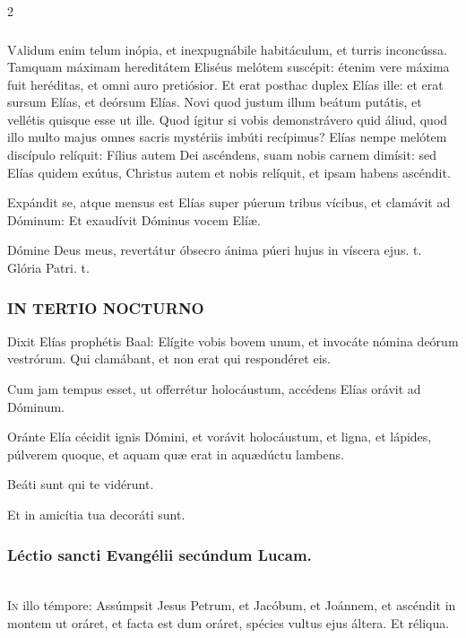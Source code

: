 \documentclass[9pt,twoside]{extarticle}
\begin{document}
\begin{multicols}{2}
\subsubsection*{\center {}}
\lettrine{V}alidum enim telum inópia, et inexpugnábile habitáculum, et turris inconcússa. Tamquam máximam hereditátem Eliséus melótem suscépit: étenim vere máxima fuit heréditas, et omni auro pretiósior. Et erat posthac duplex Elías ille: et erat sursum Elías, et deórsum Elías. Novi quod justum illum beátum putátis, et vellétis quisque esse ut ille. Quod ígitur si vobis demonstrávero quid áliud, quod illo multo majus omnes sacris mystériis imbúti recípimus? Elías nempe melótem discípulo relíquit: Fílius autem Dei ascéndens, suam nobis carnem dimísit: sed Elías quidem exútus, Christus autem et nobis relíquit, et ipsam habens ascéndit.

\begin{tightlist}{}
\item {} Expándit se, atque mensus est Elías super púerum tribus vícibus, et clamávit ad Dóminum: \textred{*} Et exaudívit Dóminus vocem Elíæ.
\item {} Dómine Deus meus, revertátur óbsecro ánima púeri hujus in víscera ejus. t. Glória Patri. t.
\end{tightlist}

\subsubsection*{\center \textsc{IN TERTIO NOCTURNO}}
\begin{tightlist}{}
\item {} Dixit Elías prophétis Baal: Elígite vobis bovem unum, et invocáte nómina deórum vestrórum. Qui clamábant, et non erat qui respondéret eis.
\item {} Cum jam tempus esset, ut offerrétur holocáustum, accédens Elías orávit ad Dóminum.
\item {} Oránte Elía cécidit ignis Dómini, et vorávit holocáustum, et ligna, et lápides, púlverem quoque, et aquam quæ erat in aquædúctu lambens.
\item {} Beáti sunt qui te vidérunt.
\item {} Et in amicítia tua decoráti sunt.
\end{tightlist}

\subsubsection*{\center Léctio sancti Evangélii secúndum Lucam.}
\noindent {}\\
\lettrine{I}n illo témpore: Assúmpsit Jesus Petrum, et Jacóbum, et Joánnem, et ascéndit in montem ut oráret, et facta est dum oráret, spécies vultus ejus áltera. Et réliqua. 


\end{multicols}
\end{document}
